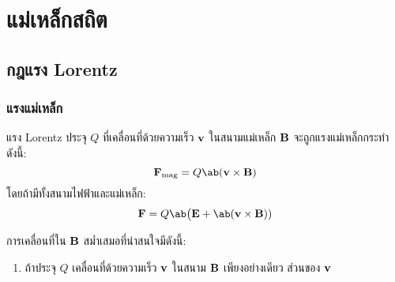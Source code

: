\chapter{แม่เหล็กสถิต}
\section{กฎแรง Lorentz}
\subsection{แรงแม่เหล็ก}

\begin{lawbox}{แรง Lorentz}
    ประจุ $Q$ ที่เคลื่อนที่ด้วยความเร็ว $\mathbf{v}$ ในสนามแม่เหล็ก $\mathbf{B}$ จะถูกแรงแม่เหล็กกระทำดังนี้:
    \begin{equation}
        \vF_\txt{mag} = Q\ab(\vv\times\vB)
    \end{equation}
    โดยถ้ามีทั้งสนามไฟฟ้าและแม่เหล็ก:
    \begin{equation}
        \vF = Q\ab\big(\vE + \ab(\vv\times\vB))
    \end{equation}
\end{lawbox}
การเคลื่อนที่ใน $\mathbf{B}$ สม่ำเสมอที่น่าสนใจมีดังนี้:
\begin{enumerate}
    \item ถ้าประจุ $Q$ เคลื่อนที่ด้วยความเร็ว $\mathbf{v}$ ในสนาม $\mathbf{B}$ เพียงอย่างเดียว ส่วนของ $\mathbf{v}$
\end{enumerate}